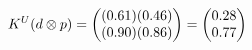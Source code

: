 \documentclass[preview]{standalone}
\begin{document}
\begin{align*}
\special{dvisvgm:raw <g id='unique000'>}K^U(d \otimes p) = \begin{pmatrix} (0.61)(0.46) \\ (0.90)(0.86) \end{pmatrix} = \begin{pmatrix} 0.28 \\ 0.77 \end{pmatrix}\special{dvisvgm:raw </g>}
\end{align*}
\end{document}
